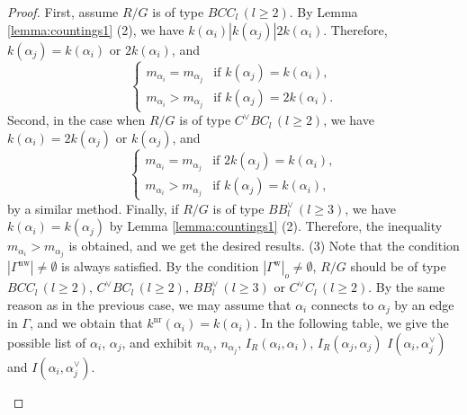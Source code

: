 \documentclass[11pt]{amsart}
\newcommand{\nr}{\mathrm{nr}}
\newcommand{\w}{\mathrm{w}}
\newcommand{\nw}{\mathrm{nw}}
\begin{document}
{\begin{proof}
First, assume $R/G$ is of type $BCC_l\, (l\geq 2)$. 
By Lemma \ref{lemma:countings1} (2), we have 
$k(\alpha_i)|k(\alpha_j)|2k(\alpha_i)$.
Therefore, $k(\alpha_j)=k(\alpha_i)$ or $2k(\alpha_i)$, and 
\[\begin{cases}
m_{\alpha_i}=m_{\alpha_j} & \text{if $k(\alpha_j)=k(\alpha_i)$},\\
m_{\alpha_i}>m_{\alpha_j} & \text{if $k(\alpha_j)=2k(\alpha_i)$}.
\end{cases}\]
Second, in the case when $R/G$ is of type $C^\vee BC_l\, (l\geq 2)$, we have
$k(\alpha_i)=2k(\alpha_j)$ or $k(\alpha_j)$, and 
\[\begin{cases}
m_{\alpha_i}=m_{\alpha_j} & \text{if $2k(\alpha_j)=k(\alpha_i)$},\\
m_{\alpha_i}>m_{\alpha_j} & \text{if $k(\alpha_j)=k(\alpha_i)$},
\end{cases}\]
by a similar method. Finally, if $R/G$ is of type $BB^\vee_l\, (l\geq 3)$, we have
$k(\alpha_i)=k(\alpha_j)$ by Lemma \ref{lemma:countings1} (2). 
Therefore, the inequality $m_{\alpha_i}>m_{\alpha_j}$ is obtained, and 
we get the desired results.
\vskip 1mm
\noindent
(3) Note that the condition $|\Gamma^\nw|\ne \emptyset$
is always satisfied. By the condition $|\Gamma^\w|_o\ne\emptyset$, $R/G$ 
should be of type $BCC_l \,(l\geq 2),\, C^\vee BC_l\,(l\geq 2),\, 
BB^\vee_l\,(l\geq 3)$ or $C^\vee C_l\,(l\geq 2)$. By the same reason as 
 in the previous case, we may assume that $\alpha_i$ connects to 
$\alpha_j$ by an edge in $\Gamma$, and we obtain that $k^\nr(\alpha_i)=k(\alpha_i)$. 
In the following table, we give the possible list of 
$\alpha_i$, $\alpha_j$, and exhibit $n_{\alpha_i}$, $n_{\alpha_j}$, 
$I_R(\alpha_i,\alpha_i)$, $I_R(\alpha_j,\alpha_j)$
$I(\alpha_i,\alpha_j^\vee)$ and $I(\alpha_i,\alpha_j^\vee)$.
\begin{center}
\begin{table}[h]
\label{table2-alpha_i-alpha_j}
\vskip -2mm
\end{table}
\end{center}
\end{proof}}
\end{document}
